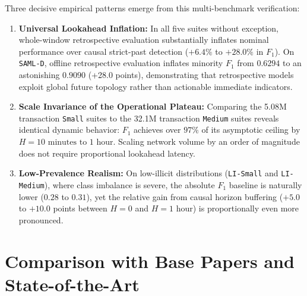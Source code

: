 \documentclass[pdflatex,sn-mathphys,Numbered]{sn-jnl}
\theoremstyle{thmstyleone}
\theoremstyle{thmstyletwo}
\theoremstyle{thmstylethree}
\begin{document}
Three decisive empirical patterns emerge from this multi-benchmark verification:
\begin{enumerate}
    \item \textbf{Universal Lookahead Inflation:} In all five suites without exception, whole-window retrospective evaluation substantially inflates nominal performance over causal strict-past detection ($+6.4\%$ to $+28.0\%$ in $F_1$). On \texttt{SAML-D}, offline retrospective evaluation inflates minority $F_1$ from $0.6294$ to an astonishing $0.9090$ (+28.0 points), demonstrating that retrospective models exploit global future topology rather than actionable immediate indicators.
    \item \textbf{Scale Invariance of the Operational Plateau:} Comparing the 5.08M transaction \texttt{Small} suites to the 32.1M transaction \texttt{Medium} suites reveals identical dynamic behavior: $F_1$ achieves over $97\%$ of its asymptotic ceiling by $H = 10\text{ minutes to } 1\text{ hour}$. Scaling network volume by an order of magnitude does not require proportional lookahead latency.
    \item \textbf{Low-Prevalence Realism:} On low-illicit distributions (\texttt{LI-Small} and \texttt{LI-Medium}), where class imbalance is severe, the absolute $F_1$ baseline is naturally lower ($0.28$ to $0.31$), yet the relative gain from causal horizon buffering ($+5.0$ to $+10.0$ points between $H=0$ and $H=1\text{ hour}$) is proportionally even more pronounced.
\end{enumerate}

\section{Comparison with Base Papers and State-of-the-Art}
\label{sec:sota_comparison}
\end{document}
